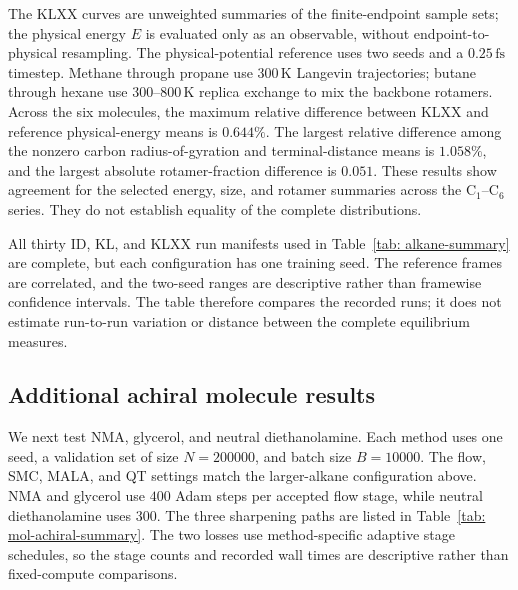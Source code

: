 \documentclass{article}
\begin{document}
The KLXX curves are unweighted summaries of the finite-endpoint sample sets; the physical energy $E$ is evaluated only as an observable, without endpoint-to-physical resampling. The physical-potential reference uses two seeds and a $0.25\,\mathrm{fs}$ timestep. Methane through propane use $300\,\mathrm K$ Langevin trajectories; butane through hexane use $300$--$800\,\mathrm K$ replica exchange to mix the backbone rotamers. Across the six molecules, the maximum relative difference between KLXX and reference physical-energy means is $0.644\%$. The largest relative difference among the nonzero carbon radius-of-gyration and terminal-distance means is $1.058\%$, and the largest absolute rotamer-fraction difference is $0.051$. These results show agreement for the selected energy, size, and rotamer summaries across the \(\mathrm C_1\)--\(\mathrm C_6\) series. They do not establish equality of the complete distributions.

All thirty ID, KL, and KLXX run manifests used in Table~\ref{tab: alkane-summary} are complete, but each configuration has one training seed. The reference frames are correlated, and the two-seed ranges are descriptive rather than framewise confidence intervals. The table therefore compares the recorded runs; it does not estimate run-to-run variation or distance between the complete equilibrium measures.


\subsection{Additional achiral molecule results}
\label{sec: mol-achiral-results}

We next test NMA, glycerol, and neutral diethanolamine. Each method uses one seed, a validation set of size \(N=200000\), and batch size \(B=10000\). The flow, SMC, MALA, and QT settings match the larger-alkane configuration above. NMA and glycerol use \(400\) Adam steps per accepted flow stage, while neutral diethanolamine uses \(300\). The three sharpening paths are listed in Table~\ref{tab: mol-achiral-summary}. The two losses use method-specific adaptive stage schedules, so the stage counts and recorded wall times are descriptive rather than fixed-compute comparisons.
\end{document}
